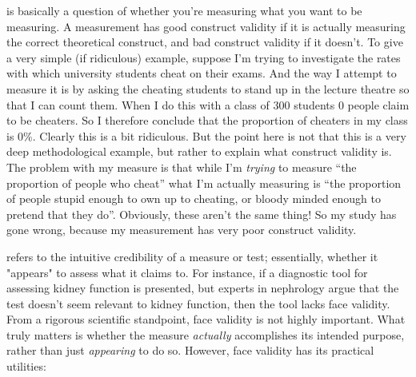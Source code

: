 
 is basically a question of whether you're measuring what you want to be measuring.  A measurement has good construct validity if it is actually measuring the correct theoretical construct, and bad construct validity if it doesn't.  To give a very simple (if ridiculous) example, suppose I'm trying to investigate the rates with which university students cheat on their exams. And the way I attempt to measure it is by asking the cheating students to stand up in the lecture theatre so that I can count them. When I do this with a class of 300 students 0 people claim to be cheaters. So I therefore conclude that the proportion of cheaters in my class is 0\%. Clearly this is a bit ridiculous. But the point here is not that this is a very deep methodological example, but rather to explain what construct validity is. The problem with my measure is that while I'm {\it trying} to measure ``the proportion of people who cheat'' what I'm actually measuring is ``the proportion of people stupid enough to own up to cheating, or bloody minded enough to pretend that they do''. Obviously, these aren't the same thing! So my study has gone wrong, because my measurement has very poor construct validity.


 refers to the intuitive credibility of a measure or test; essentially, whether it "appears" to assess what it claims to. For instance, if a diagnostic tool for assessing kidney function is presented, but experts in nephrology argue that the test doesn't seem relevant to kidney function, then the tool lacks face validity. From a rigorous scientific standpoint, face validity is not highly important. What truly matters is whether the measure \textit{actually} accomplishes its intended purpose, rather than just \textit{appearing} to do so. However, face validity has its practical utilities:


